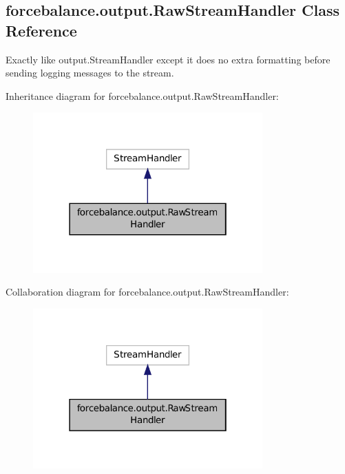 \hypertarget{classforcebalance_1_1output_1_1RawStreamHandler}{\subsection{forcebalance.\-output.\-Raw\-Stream\-Handler Class Reference}
\label{classforcebalance_1_1output_1_1RawStreamHandler}
}


Exactly like output.\-Stream\-Handler except it does no extra formatting before sending logging messages to the stream.  




Inheritance diagram for forcebalance.\-output.\-Raw\-Stream\-Handler\-:
\nopagebreak
\begin{figure}[H]
\begin{center}
\leavevmode
\includegraphics[width=250pt]{classforcebalance_1_1output_1_1RawStreamHandler__inherit__graph}
\end{center}
\end{figure}


Collaboration diagram for forcebalance.\-output.\-Raw\-Stream\-Handler\-:
\nopagebreak
\begin{figure}[H]
\begin{center}
\leavevmode
\includegraphics[width=250pt]{classforcebalance_1_1output_1_1RawStreamHandler__coll__graph}
\end{center}
\end{figure}
